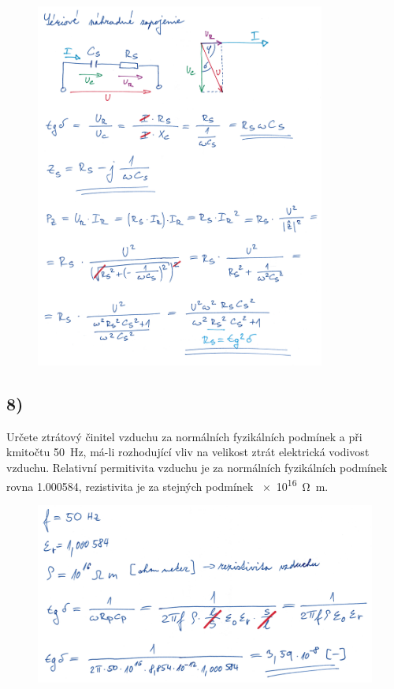 \begin{figure}[h]
    \centering
    \includegraphics*[width=0.85\textwidth]{images/diel7.jpg}
\end{figure}

\newpage


\subsection*{8)}
Určete ztrátový činitel vzduchu za normálních fyzikálních podmínek a při kmitočtu \SI{50}{\hertz}, má-li rozhodující vliv na velikost ztrát elektrická vodivost vzduchu. Relativní permitivita vzduchu je za normálních fyzikálních podmínek rovna \SI{1,000584}{}, rezistivita je za stejných podmínek \SI{e16}{\ohm\meter}.

\begin{figure}[h]
    \centering
    \includegraphics*[width=\textwidth]{images/diel8.jpg}
\end{figure}

